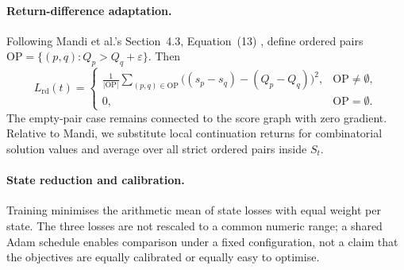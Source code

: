 \paragraph{Return-difference adaptation.}
Following Mandi et al.'s Section~4.3, Equation~(13)
\citep{mandi2022decision}, define ordered pairs
$\mathrm{OP}=\{(p,q):Q_p>Q_q+\varepsilon\}$. Then
\begin{equation}
  L_{\mathrm{rd}}(t)
  =
  \begin{cases}
  \displaystyle\frac{1}{|\mathrm{OP}|}
  \sum_{(p,q)\in\mathrm{OP}}
  \bigl((s_p-s_q)-(Q_p-Q_q)\bigr)^2,
  & \mathrm{OP}\neq\emptyset,\\[1em]
  0, & \mathrm{OP}=\emptyset.
  \end{cases}
\end{equation}
The empty-pair case remains connected to the score graph with zero gradient.
Relative to Mandi, we substitute local continuation returns for combinatorial
solution values and average over all strict ordered pairs inside $S_t$.

\paragraph{State reduction and calibration.}
Training minimises the arithmetic mean of state losses with equal weight per
state. The three losses are not rescaled to a common numeric range; a shared
Adam schedule enables comparison under a fixed configuration, not a claim that
the objectives are equally calibrated or equally easy to optimise.
